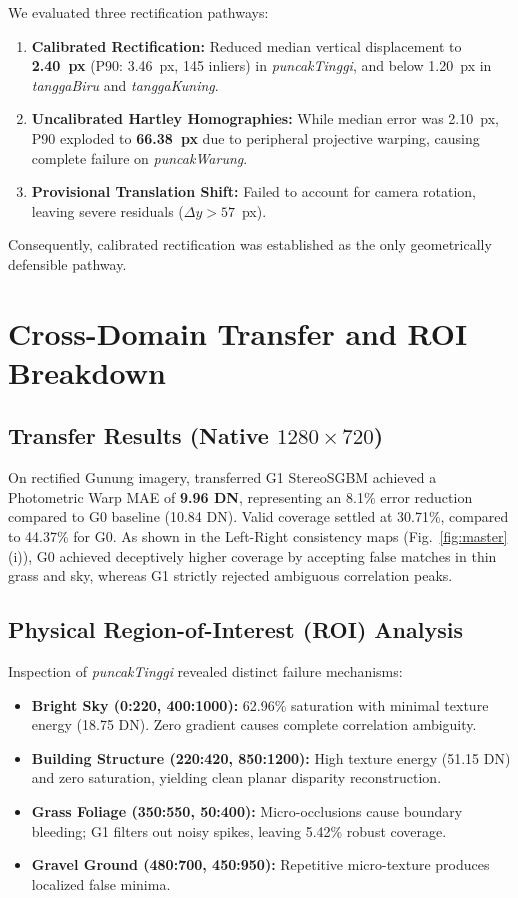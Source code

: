 \documentclass[journal]{IEEEtran}
\begin{document}
We evaluated three rectification pathways:
\begin{enumerate}
    \item \textbf{Calibrated Rectification:} Reduced median vertical displacement to \textbf{2.40~px} (P90: 3.46~px, 145 inliers) in \textit{puncakTinggi}, and below 1.20~px in \textit{tanggaBiru} and \textit{tanggaKuning}.
    \item \textbf{Uncalibrated Hartley Homographies:} While median error was 2.10~px, P90 exploded to \textbf{66.38~px} due to peripheral projective warping, causing complete failure on \textit{puncakWarung}.
    \item \textbf{Provisional Translation Shift:} Failed to account for camera rotation, leaving severe residuals ($\Delta y > 57$~px).
\end{enumerate}
Consequently, calibrated rectification was established as the only geometrically defensible pathway.

\section{Cross-Domain Transfer and ROI Breakdown}
\subsection{Transfer Results (Native $1280 \times 720$)}
On rectified Gunung imagery, transferred G1 StereoSGBM achieved a Photometric Warp MAE of \textbf{9.96 DN}, representing an 8.1\% error reduction compared to G0 baseline (10.84 DN). Valid coverage settled at 30.71\%, compared to 44.37\% for G0. As shown in the Left-Right consistency maps (Fig.~\ref{fig:master}(i)), G0 achieved deceptively higher coverage by accepting false matches in thin grass and sky, whereas G1 strictly rejected ambiguous correlation peaks.

\subsection{Physical Region-of-Interest (ROI) Analysis}
Inspection of \textit{puncakTinggi} revealed distinct failure mechanisms:
\begin{itemize}
    \item \textbf{Bright Sky (0:220, 400:1000):} 62.96\% saturation with minimal texture energy (18.75 DN). Zero gradient causes complete correlation ambiguity.
    \item \textbf{Building Structure (220:420, 850:1200):} High texture energy (51.15 DN) and zero saturation, yielding clean planar disparity reconstruction.
    \item \textbf{Grass Foliage (350:550, 50:400):} Micro-occlusions cause boundary bleeding; G1 filters out noisy spikes, leaving 5.42\% robust coverage.
    \item \textbf{Gravel Ground (480:700, 450:950):} Repetitive micro-texture produces localized false minima.
\end{itemize}
\end{document}
